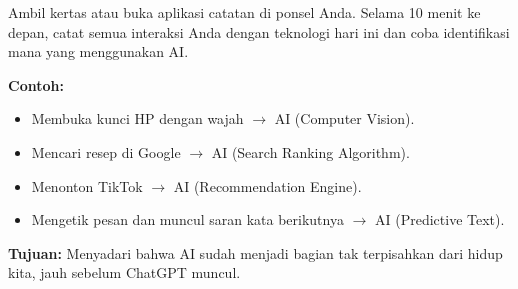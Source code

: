 \begin{exercisebox}
Ambil kertas atau buka aplikasi catatan di ponsel Anda. Selama 10 menit ke depan, catat semua interaksi Anda dengan teknologi hari ini dan coba identifikasi mana yang menggunakan AI.

\textbf{Contoh:}
\begin{itemize}
    \item Membuka kunci HP dengan wajah $\rightarrow$ AI (Computer Vision).
    \item Mencari resep di Google $\rightarrow$ AI (Search Ranking Algorithm).
    \item Menonton TikTok $\rightarrow$ AI (Recommendation Engine).
    \item Mengetik pesan dan muncul saran kata berikutnya $\rightarrow$ AI (Predictive Text).
\end{itemize}

\vspace{0.5cm}
\textbf{Tujuan:} Menyadari bahwa AI sudah menjadi bagian tak terpisahkan dari hidup kita, jauh sebelum ChatGPT muncul.
\end{exercisebox}
